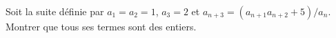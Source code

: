 Soit la suite définie par $a_1 = a_2 = 1$, $a_3 = 2$ et $a_{n+3} = (a_{n+1}a_{n+2} + 5)/a_n$. Montrer que tous ses termes sont des entiers.
